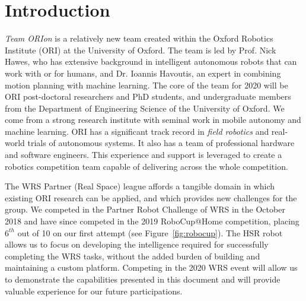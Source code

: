 \documentclass[runningheads,a4paper]{llncs}
\newcommand{\teamori}{Team ORIon}
\begin{document}

\section{Introduction}

\textit{\teamori{}} is a relatively new team created within the Oxford Robotics Institute
(ORI) at the University of Oxford. The team is led by Prof. Nick Hawes, who has extensive background in intelligent autonomous robots that can work with or for humans, and Dr. Ioannis Havoutis, an expert in combining motion planning with machine learning. The core of the team for 2020 will be ORI post-doctoral researchers and PhD students, and undergraduate members from the Department of Engineering Science of the University of Oxford. We come from a strong research institute with seminal work in mobile autonomy and machine learning. ORI has a significant track record in \emph{field robotics} and real-world trials of autonomous systems. It also has a team of professional
hardware and software engineers. This experience and support is leveraged
to create a robotics competition team capable of delivering across the whole
competition. 

The WRS Partner (Real Space) league affords a tangible domain in
which existing ORI research can be applied, and which provides new challenges
for the group. We competed in the Partner Robot Challenge of WRS in the October 2018 and have since competed in the 2019 RoboCup@Home competition, placing $6^{th}$ out of 10 on our first attempt (see Figure~\ref{fig:robocup}). 
The HSR robot allows us to focus on developing the
intelligence required for successfully completing the WRS tasks, 
without the added burden of building and maintaining a custom platform. 
Competing in the 2020 WRS event will allow us to demonstrate 
the capabilities presented in this document and will provide valuable experience
for our future participations.
\end{document}
